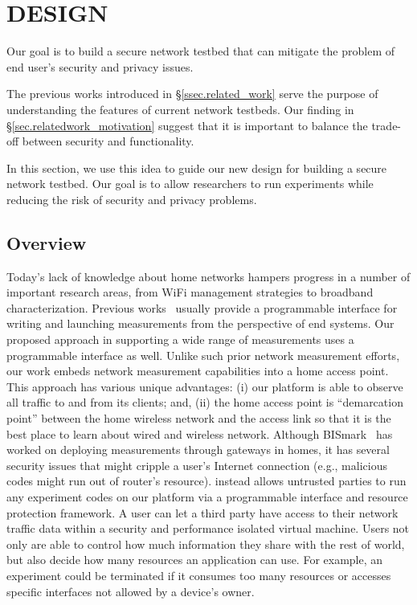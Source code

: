\chapter{\sysname DESIGN}
\label{sec.design}
Our goal is to build a secure network testbed that can mitigate the problem 
of end user's security and privacy issues. 

The previous works introduced in \S{\ref{ssec.related_work}} serve the purpose of understanding the features of current network testbeds. Our finding in \S{\ref{sec.relatedwork_motivation}} suggest that it is important to balance the trade-off between security and functionality.

In this section, we use this idea to guide our new design for building a secure network testbed. Our goal is to allow researchers to run experiments while reducing the risk of security and privacy problems.

\section{Overview}
Today's lack of knowledge about home networks hampers progress in a number of important research areas, from WiFi management strategies to broadband characterization. Previous works~\cite{sanchez2014measurement,dhawan2012fathom} usually provide a programmable interface for writing and launching measurements from the perspective of end systems. Our proposed approach in supporting a wide range of measurements uses a programmable interface as well. Unlike such prior network measurement efforts, our work embeds network measurement capabilities into a home access point. This approach has various unique advantages: (i) our platform is able to observe all traffic to and from its clients; and, (ii) the home access point is ``demarcation point'' between the home wireless network and the access link so that it is the best place to learn about wired and wireless network. Although BISmark~\cite{183951} has worked on deploying measurements through gateways in homes, it has several security issues that might cripple a user's Internet connection (e.g., malicious codes might run out of router's resource). \sysname instead allows untrusted parties to run any experiment codes on our platform via a programmable interface and resource protection framework. A user can let a third party have access to their network traffic data within a security and performance isolated virtual machine. Users not only are able to control how much information they share with the rest of world, but also decide how many resources an application can use. For example, an experiment could be terminated if it consumes too many resources or accesses specific interfaces not allowed by a device's owner. 

